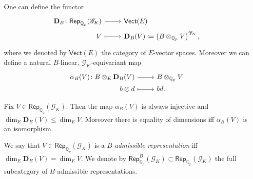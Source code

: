 \begin{defn}[]
	One can define the functor
	\begin{equation*}
	\begin{tikzcd}[row sep = 0ex
		,/tikz/column 1/.append style={anchor=base east}
		,/tikz/column 2/.append style={anchor=base west}]
		\mathbf{D}_B\colon \mathsf{Rep}_{\mathbb{Q}_p}(\mathscr{G}_K) \arrow[r, "", rightarrow] &
		\mathsf{Vect}(E) \\
		V \arrow[r, "", mapsto] & 
		\mathbf{D}_B(V) \coloneqq \left( B \otimes_{\mathbb{Q}_p} V \right)^{\mathscr{G}_K}
	,\end{tikzcd}
	\end{equation*} 
	where we denoted by $\mathsf{Vect}(E)$ the category of $E$-vector spaces.
	Moreover we can define a natural $B$-linear, $\mathscr{G}_K$-equivariant map
	\begin{equation*}
	\begin{tikzcd}[row sep = 0ex
		,/tikz/column 1/.append style={anchor=base east}
		,/tikz/column 2/.append style={anchor=base west}]
		\alpha_B(V)\colon 
		B \otimes_E \mathbf{D}_B(V) \arrow[r, "", rightarrow] &
		B \otimes_{\mathbb{Q}_p} V \\
		b \otimes d
		\arrow[r, "", mapsto] & 
		bd
	.\end{tikzcd}
	\end{equation*}
\end{defn}


\begin{prop}
	Fix $V \in \mathsf{Rep}_{\mathbb{Q}_p}(\mathscr{G}_K)$.
	Then the map $\alpha_B(V)$ is always injective and
	$\dim_E \mathbf{D}_B(V) \leq \dim_E V$.
	Moreover there is equality of dimensions iff $\alpha_B(V)$ is an isomorphism.
\end{prop}


\begin{defn}
	We say that $V \in \mathsf{Rep}_{\mathbb{Q}_p}(\mathscr{G}_K)$ is a
	{\em $B$-admissible representation} iff 
	$\dim_E \mathbf{D}_B(V) = \dim_E V$.
	We denote by $\mathsf{Rep}_{\mathbb{Q}_p}^B(\mathscr{G}_K) \subset
	\mathsf{Rep}_{\mathbb{Q}_p}(\mathscr{G}_K)$
	the full subcategory of $B$-admissible representations.
\end{defn}


